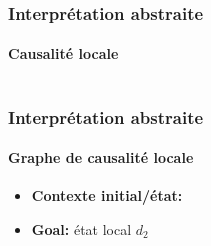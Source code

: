 \begin{frame}[t]
\frametitle{Interprétation abstraite}
\framesubtitle{Causalité locale}
\begin{columns}
\begin{column}{0.4\textwidth}
\begin{center}\scalebox{\scaleex}{
\begin{tikzpicture}
\exanaidef
\end{tikzpicture}
}\end{center}
\end{column}
\begin{column}{0.6\textwidth}



\begin{center}\scalebox{\scaleex}{
\exlcgaidef
}\end{center}

\end{column}
\end{columns}
\end{frame}

\begin{frame}
\frametitle{Interprétation abstraite}
\framesubtitle{Graphe de causalité locale}
\begin{itemize}
 \item \textbf{Contexte initial/état:} 
 \item \textbf{Goal:} état local {\color{blue}$d_2$}
\end{itemize}
\begin{columns}
\begin{column}{0.5\textwidth}
\begin{center}\end{center}
\end{column}
\begin{column}{0.5\textwidth}
\begin{center}\scalebox{0.7}{
\exglcandef
}\end{center}
\end{column}
\end{columns}
\end{frame}

